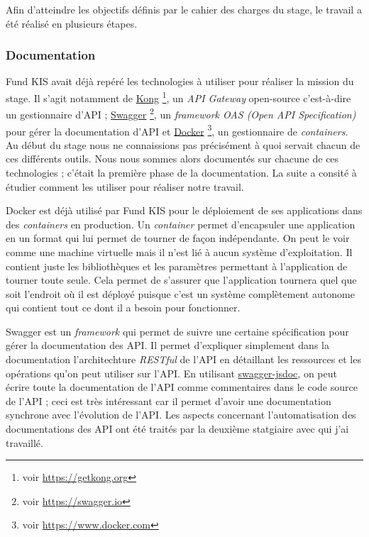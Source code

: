 Afin d'atteindre les objectifs définis par le cahier des charges du stage, le travail a été réalisé en plusieurs étapes.

\subsubsection{Documentation}
Fund KIS avait déjà repéré les technologies à utiliser pour réaliser la mission du stage. Il s'agit notamment de \href{https://getkong.org}{Kong} \footnote{voir \url{https://getkong.org}}, un \textit{API Gateway} open-source c'est-à-dire un gestionnaire d'API ; \href{https://swagger.io}{Swagger} \footnote{voir \url{https://swagger.io}}, un \textit{framework OAS (Open API Specification)} pour gérer la documentation d'API et \href{https://www.docker.com}{Docker} \footnote{voir \url{https://www.docker.com}}, un gestionnaire de \textit{containers}. Au début du stage nous ne connaissions pas précisément à quoi servait chacun de ces différents outils. Nous nous sommes alors documentés sur chacune de ces technologies ; c'était la première phase de la documentation. La suite a consité à étudier comment les utiliser pour réaliser notre travail.

\vspace{3mm}

Docker est déjà utilisé par Fund KIS pour le déploiement de ses applications dans des \textit{containers} en production. Un \textit{container} permet d'encapsuler une application en un format qui lui permet de tourner de façon indépendante. On peut le voir comme une machine virtuelle mais il n'est lié à aucun système d'exploitation. Il contient juste les bibliothèques et les paramètres permettant à l'application de tourner toute seule. Cela permet de s'assurer que l'application tournera quel que soit l'endroit où il est déployé puisque c'est un système complètement autonome qui contient tout ce dont il a besoin pour fonctionner.

\vspace{3mm}

Swagger est un \textit{framework} qui permet de suivre une certaine spécification pour gérer la documentation des API. Il permet d'expliquer simplement dans la documentation l'architechture \textit{RESTful} de l'API en détaillant les ressources et les opérations qu'on peut utiliser sur l'API. En utilisant \href{https://github.com/Surnet/swagger-jsdoc}{swagger-jsdoc}, on peut écrire toute la documentation de l'API comme commentaires dans le code source de l'API ; ceci est très intéressant car il permet d'avoir une documentation synchrone avec l'évolution de l'API. Les aspects concernant l'automatisation des documentations des API ont été traités par la deuxième statgiaire avec qui j'ai travaillé.

